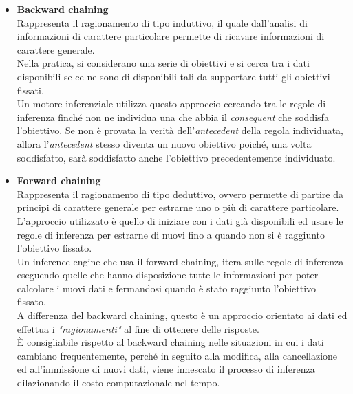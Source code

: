 \begin{itemize}
	 
	 \item \textbf{Backward chaining} \\
	 Rappresenta il ragionamento di tipo induttivo, il quale dall'analisi di informazioni di carattere particolare permette di ricavare informazioni di carattere generale. \\
	 Nella pratica, si considerano una serie di obiettivi e si cerca tra i dati disponibili se ce ne sono di disponibili tali da supportare tutti gli obiettivi fissati.\\
	 Un motore inferenziale utilizza questo approccio cercando tra le regole di inferenza finché non ne individua una che abbia il \textit{consequent} che soddisfa l'obiettivo.
	 Se non è provata la verità dell'\textit{antecedent} della regola individuata, allora l'\textit{antecedent} stesso diventa un nuovo obiettivo poiché, una volta soddisfatto, sarà soddisfatto anche l'obiettivo precedentemente individuato.  
	 
	 
	\item \textbf{Forward chaining} \\
	 Rappresenta il ragionamento di tipo deduttivo, ovvero permette di partire da principi di carattere generale per estrarne uno o più di carattere particolare.\\
	 L'approccio utilizzato è quello di iniziare con i dati già disponibili ed usare le regole di inferenza per estrarne di nuovi fino a quando non si è raggiunto l'obiettivo fissato.\\
	 Un inference engine che usa il forward chaining, itera sulle regole di inferenza eseguendo quelle che hanno disposizione tutte le informazioni per poter calcolare i nuovi dati  e fermandosi quando è stato raggiunto l'obiettivo fissato.  \\
	 A differenza del backward chaining, questo è un approccio orientato ai dati ed effettua i \textit{"ragionamenti"} al fine di ottenere delle risposte. \\
	 È consigliabile rispetto al backward chaining nelle situazioni in cui i dati cambiano frequentemente, perché in seguito alla modifica, alla cancellazione ed all'immissione di nuovi dati, viene innescato il processo di inferenza dilazionando il costo computazionale nel tempo.
\end{itemize} 
 
 
 
